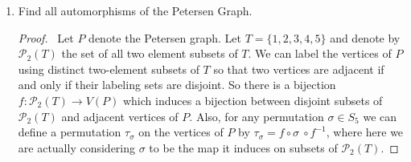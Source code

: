 \documentclass[12pt]{article}
\newcommand{\p}{\mathcal{P}_2(T)}
\begin{document}
\begin{enumerate}[leftmargin=0cm,itemindent=.5cm,labelwidth=\itemindent,labelsep=0cm,align=left]
\begin{proof}
%
%


\end{proof}

\item Find all automorphisms of the Petersen Graph.

\begin{proof}

\ Let $P$ denote the Petersen graph.  Let $T = \{1,2,3,4,5\}$ and denote by $\p$ the set of all two element subsets of $T$.
We can label the vertices of $P$ using distinct two-element subsets of $T$ so that two vertices are adjacent if and only if their labeling sets are disjoint.  So there is a bijection $f:\p \rightarrow V(P)$ which induces a bijection between disjoint subsets of $\p$ and adjacent vertices of $P$.  Also, for any permutation $\sigma \in S_5$ we can define a permutation $\tau_\sigma$ on the vertices of $P$ by $\tau_\sigma = f \circ \sigma \ \circ f^{-1}$, where here we are actually considering $\sigma$ to be the map it induces on subsets of $\p$.


\end{proof}
\end{enumerate}
\end{document}

